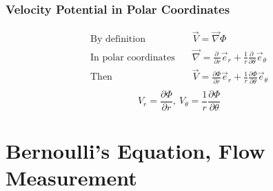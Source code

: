 \documentclass[draft=false, titlepage]{article}
\newcommand{\gradient}{\vec{\nabla}}
\newcommand{\partialfrac}[2]{\frac{\partial #1}{\partial #2}}
\begin{document}
\subsubsection*{Velocity Potential in Polar Coordinates}
\begin{align*}
    \text{By definition} & \quad \vec{V} = \gradient \Phi \\
    \text{In polar coordinates} & \quad \gradient = \partialfrac{~}{r}\vec{e}_r + \frac{1}{r} \partialfrac{~}{\theta} \vec{e}_\theta \\
    \text{Then} & \quad \vec{V} = \partialfrac{\Phi}{r}\vec{e}_r + \frac{1}{r} \partialfrac{\Phi}{\theta}\vec{e}_\theta \\
\end{align*}
\begin{equation}
    V_r = \partialfrac{\Phi}{r},\ V_\theta = \frac{1}{r}\partialfrac{\Phi}{\theta}
    \label{eq:PolarPotentialToVelocity}
\end{equation}

\section{Bernoulli's Equation, Flow Measurement}
\end{document}
